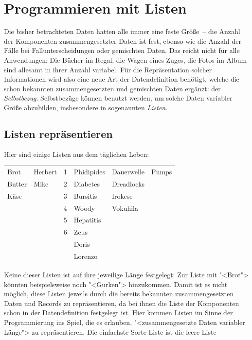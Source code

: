 
\chapter{Programmieren mit Listen}
\label{cha:rek}

Die bisher betrachteten Daten hatten alle immer eine feste Größe~--
die Anzahl der Komponenten zusammengesetzter Daten ist fest, ebenso wie die
Anzahl der Fälle bei Fallunterscheidungen oder gemischten Daten.  Das
reicht nicht für alle Anwendungen: Die Bücher im Regal, die Wagen
eines Zuges, die Fotos im Album sind allesamt in ihrer Anzahl
variabel.  Für die Repräsentation solcher Informationen wird also eine
neue Art der Datendefinition benötigt, welche die schon bekannten
zusammengesetzten und gemischten Daten ergänzt: der
\textit{Selbstbezug}.  Selbstbezüge können benutzt werden, um solche
Daten variabler Größe abzubilden, insbesondere in sogenannten
\textit{Listen}.

\section{Listen repräsentieren}
\label{sec:lists}

Hier sind einige Listen aus dem täglichen Leben:
%
\begin{center}
  \begin{tabular}{l@{\qquad}l@{\qquad}l@{\qquad}l@{\qquad}l@{\qquad}l}
  Brot & Herbert & 1 & Phidipides & Dauerwelle & Pumps \\
  Butter & Mike & 2 & Diabetes & Dreadlocks \\
  Käse & & 3 & Bursitis & Irokese \\
  & & 4 & Woody & Vokuhila \\
  && 5 & Hepatitis \\
  && 6 & Zeus \\
  &&& Doris\\
  &&& Lorenzo
\end{tabular}
\end{center}
%
Keine dieser Listen ist auf ihre jeweilige Länge festgelegt: Zur Liste
mit "<Brot"> könnten beispielsweise noch "<Gurken"> hinzukommen.  Damit ist es
nicht möglich, diese Listen jeweils durch die bereits bekannten
zusammengesetzten Daten und Records zu repräsentieren, da bei ihnen
die Liste der Komponenten schon in der Datendefinition festgelegt
ist.  Hier kommen Listen im Sinne der Programmierung ins Spiel, die es
erlauben, "<zusammengesetzte Daten variabler Länge"> zu
repräsentieren.  Die einfachste Sorte Liste ist die leere Liste


